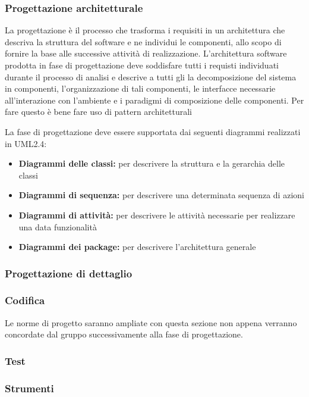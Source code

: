 \documentclass[12pt,a4paper]{article}
\begin{document}
\subsubsection{Progettazione architetturale}
La progettazione è il processo che trasforma i requisiti in un architettura che descriva la struttura del software e ne individui le componenti, allo scopo di fornire la base alle successive attività di realizzazione. L'architettura software prodotta in fase di progettazione deve soddisfare tutti i requisti individuati durante il processo di analisi e descrive a tutti gli \textit{} la decomposizione del sistema in componenti, l'organizzazione di tali componenti, le interfacce necessarie all'interazione con l'ambiente e i paradigmi di composizione delle componenti. Per fare questo è bene fare uso di pattern architetturali

La fase di progettazione deve essere supportata dai seguenti diagrammi realizzati in UML2.4:
\begin{itemize}
	\item \textbf{Diagrammi delle classi:} per descrivere la struttura e la gerarchia delle classi
	\item \textbf{Diagrammi di sequenza:} per descrivere una determinata sequenza di azioni
	\item \textbf{Diagrammi di attività:} per descrivere le attività necessarie per realizzare una data funzionalità
	\item \textbf{Diagrammi dei package:} per descrivere l'architettura generale
\end{itemize}


\subsubsection{Progettazione di dettaglio}

\subsubsection{Codifica}
Le norme di progetto saranno ampliate con questa sezione non appena verranno concordate dal gruppo successivamente alla fase di progettazione.

\subsubsection{Test}

\subsubsection{Strumenti}
\end{document}
